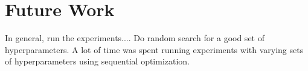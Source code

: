 \documentclass[12pt,a4paper]{article}
\begin{document}

\section{Future Work}
In general, run the experiments.... Do random search for a good set of hyperparameters. A lot of time was spent running experiments with varying sets of hyperparameters using sequential optimization.

% 
% 
% 
% 
% 
\end{document}
